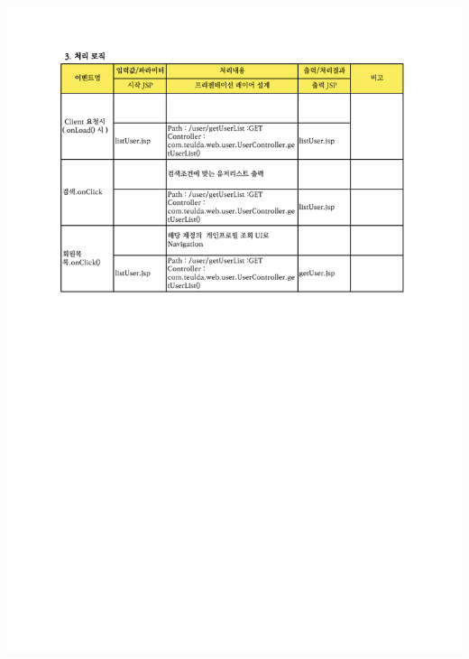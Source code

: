 {{{{{{{{{{{{{{{{{{\includegraphics[width=20cm]{./Figure/Design/Display/user/user_18.pdf} \\
}}}}}}}}}}}}}}}}}}
